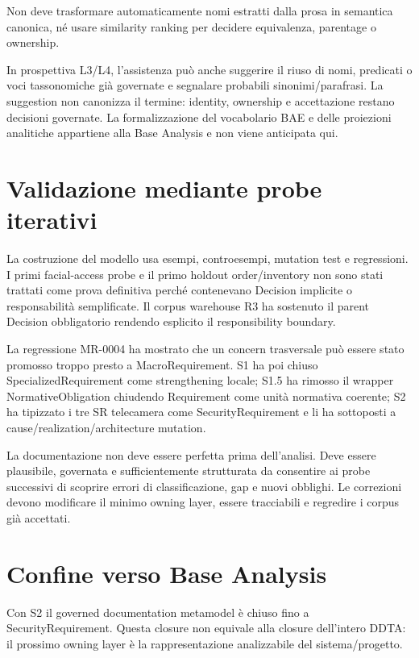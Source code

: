 \documentclass[12pt,a4paper,oneside]{report}
\begin{document}
Non deve trasformare automaticamente nomi estratti dalla prosa in semantica canonica, né usare similarity ranking per decidere equivalenza, parentage o ownership.

In prospettiva L3/L4, l'assistenza può anche suggerire il riuso di nomi, predicati o voci tassonomiche già governate e segnalare probabili sinonimi/parafrasi. La suggestion non canonizza il termine: identity, ownership e accettazione restano decisioni governate. La formalizzazione del vocabolario BAE e delle proiezioni analitiche appartiene alla Base Analysis e non viene anticipata qui.

\section{Validazione mediante probe iterativi}

La costruzione del modello usa esempi, controesempi, mutation test e regressioni. I primi facial-access probe e il primo holdout order/inventory non sono stati trattati come prova definitiva perché contenevano Decision implicite o responsabilità semplificate. Il corpus warehouse R3 ha sostenuto il parent Decision obbligatorio rendendo esplicito il responsibility boundary.

La regressione MR-0004 ha mostrato che un concern trasversale può essere stato promosso troppo presto a MacroRequirement. S1 ha poi chiuso SpecializedRequirement come strengthening locale; S1.5 ha rimosso il wrapper NormativeObligation chiudendo Requirement come unità normativa coerente; S2 ha tipizzato i tre SR telecamera come SecurityRequirement e li ha sottoposti a cause/realization/architecture mutation.

\begin{resultnote}
La documentazione non deve essere perfetta prima dell'analisi. Deve essere plausibile, governata e sufficientemente strutturata da consentire ai probe successivi di scoprire errori di classificazione, gap e nuovi obblighi. Le correzioni devono modificare il minimo owning layer, essere tracciabili e regredire i corpus già accettati.
\end{resultnote}

\section{Confine verso Base Analysis}

Con S2 il governed documentation metamodel è chiuso fino a SecurityRequirement. Questa closure non equivale alla closure dell'intero DDTA: il prossimo owning layer è la rappresentazione analizzabile del sistema/progetto.
\end{document}
